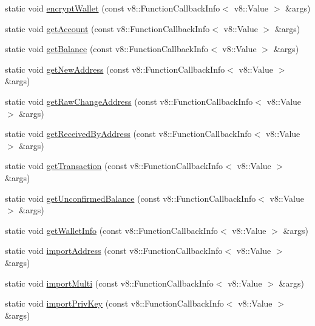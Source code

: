 \begin{DoxyCompactItemize}
static void \mbox{\hyperlink{class_rad_j_a_v_1_1_blockchain_v1_a9d8b71f1257c466c32dd5905ee54cbd1}{encrypt\+Wallet}} (const v8\+::\+Function\+Callback\+Info$<$ v8\+::\+Value $>$ \&args)
\item 
static void \mbox{\hyperlink{class_rad_j_a_v_1_1_blockchain_v1_a93bf18b6067f0103bc11485ba4fa69ae}{get\+Account}} (const v8\+::\+Function\+Callback\+Info$<$ v8\+::\+Value $>$ \&args)
\item 
static void \mbox{\hyperlink{class_rad_j_a_v_1_1_blockchain_v1_aa36862013c056f8cf1eb5db20ec955cb}{get\+Balance}} (const v8\+::\+Function\+Callback\+Info$<$ v8\+::\+Value $>$ \&args)
\item 
static void \mbox{\hyperlink{class_rad_j_a_v_1_1_blockchain_v1_a7f70a1943e8ed63e36bac342abe5aa21}{get\+New\+Address}} (const v8\+::\+Function\+Callback\+Info$<$ v8\+::\+Value $>$ \&args)
\item 
static void \mbox{\hyperlink{class_rad_j_a_v_1_1_blockchain_v1_a2f8d1f0ccb1f9f9d561455689e90b735}{get\+Raw\+Change\+Address}} (const v8\+::\+Function\+Callback\+Info$<$ v8\+::\+Value $>$ \&args)
\item 
static void \mbox{\hyperlink{class_rad_j_a_v_1_1_blockchain_v1_a306dd8c5657f39b00fab0a5f6ad8e91d}{get\+Received\+By\+Address}} (const v8\+::\+Function\+Callback\+Info$<$ v8\+::\+Value $>$ \&args)
\item 
static void \mbox{\hyperlink{class_rad_j_a_v_1_1_blockchain_v1_a69fcee85d2ed9e46823cf20847b33bbb}{get\+Transaction}} (const v8\+::\+Function\+Callback\+Info$<$ v8\+::\+Value $>$ \&args)
\item 
static void \mbox{\hyperlink{class_rad_j_a_v_1_1_blockchain_v1_aff8bd817fd128369d10c0fbba8f4d5c1}{get\+Unconfirmed\+Balance}} (const v8\+::\+Function\+Callback\+Info$<$ v8\+::\+Value $>$ \&args)
\item 
static void \mbox{\hyperlink{class_rad_j_a_v_1_1_blockchain_v1_a75e35bcb5bc7a800086cf2258490d66d}{get\+Wallet\+Info}} (const v8\+::\+Function\+Callback\+Info$<$ v8\+::\+Value $>$ \&args)
\item 
static void \mbox{\hyperlink{class_rad_j_a_v_1_1_blockchain_v1_ac093bac81cd721b8cc99926fc4d79586}{import\+Address}} (const v8\+::\+Function\+Callback\+Info$<$ v8\+::\+Value $>$ \&args)
\item 
static void \mbox{\hyperlink{class_rad_j_a_v_1_1_blockchain_v1_a8aceb19da2d2e4c30ed82ee8663bffe7}{import\+Multi}} (const v8\+::\+Function\+Callback\+Info$<$ v8\+::\+Value $>$ \&args)
\item 
static void \mbox{\hyperlink{class_rad_j_a_v_1_1_blockchain_v1_a178102c3cf5514b6f6d6c1ffbf827c72}{import\+Priv\+Key}} (const v8\+::\+Function\+Callback\+Info$<$ v8\+::\+Value $>$ \&args)

\end{DoxyCompactItemize}
